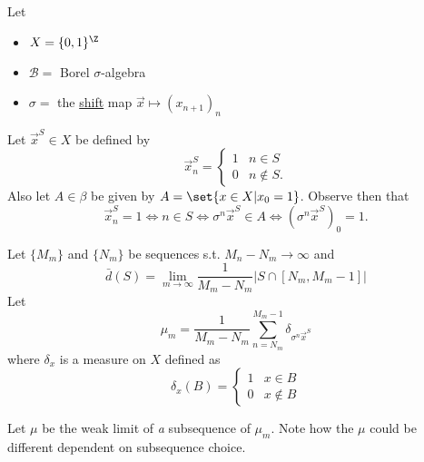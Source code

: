 \documentclass{article}
\begin{document}

Let
\begin{itemize}
  \item $X = \{0, 1\}^\Z$
  \item $\mathcal{B}=$ Borel $\sigma$-algebra
  \item $\sigma=$ the \hyperlink{def:markovshift}{shift} map $\vec{x} \mapsto (x_{n+1})_n$
\end{itemize}
Let $ \vec{x}^S \in X$ be defined by
\begin{equation*}
  \vec{x}_n^S =
  \begin{cases}
    1 & n\in S\\
    0 & n \notin S.
  \end{cases}
\end{equation*}
Also let $A\in\beta$ be given by $A = \set{x\in X | x_0 = 1}$.
Observe then that
\begin{equation*}
  \vec{x}^S_n=1\iff n\in S\iff \sigma^n\vec{x}^S\in A\iff (\sigma^n\vec{x}^S)_0=1.
\end{equation*}

Let $\{M_m\}$ and $\{N_m\}$ be sequences s.t. $ M_n-N_m\to\infty $ and
\begin{equation*} \bar{d}(S) = \lim_{m\to\infty}\frac{1}{M_m-N_m}\left|S\cap[N_m,M_m-1]\right| \end{equation*}
Let
\begin{equation*}
  \mu_m = \frac{1}{M_m-N_m}\sum_{n=N_m}^{M_m-1}\delta_{\sigma^n\vec{x}^S}
\end{equation*}
where $\delta_x$ is a measure on $X$ defined as
\begin{equation*}
  \delta_x(B) =
  \begin{cases}
    1 & x\in B\\
    0 & x\notin B
  \end{cases}
\end{equation*}

Let $\mu$ be the weak limit of \emph{a} subsequence of $\mu_m$.
Note how the $\mu$ could be different dependent on subsequence choice.
\end{document}
